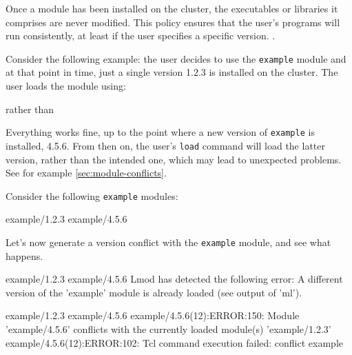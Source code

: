Once a module has been installed on the cluster, the executables or
libraries it comprises are never modified. This policy ensures that the user's
programs will run consistently, at least if the user specifies a specific
version. .

Consider the following example: the user decides to use the \lstinline|example| module
and at that point in time, just a single version 1.2.3 is installed on the cluster.
The user loads the module using:

\begin{prompt}
\end{prompt}

rather than

\begin{prompt}
\end{prompt}

Everything works fine, up to the point where a new version of \lstinline|example| is installed, 4.5.6.
From then on, the user's \lstinline|load| command will load the latter version, rather than
the intended one, which may lead to unexpected problems.
\ifgent %
See for example \autoref{sec:module-conflicts}.
\fi

Consider the following \lstinline|example| modules:

\begin{prompt}
example/1.2.3
example/4.5.6
\end{prompt}

Let's now generate a version conflict with the \lstinline|example| module, and see what happens.

\ifusinglmod
\begin{prompt}
example/1.2.3              example/4.5.6
Lmod has detected the following error:  A different version of the 'example'
module is already loaded (see output of 'ml').
\end{prompt}
\else
\begin{prompt}
example/1.2.3              example/4.5.6
example/4.5.6(12):ERROR:150: Module 'example/4.5.6' conflicts with the currently loaded module(s) 'example/1.2.3'
example/4.5.6(12):ERROR:102: Tcl command execution failed: conflict example
\end{prompt}
\fi

